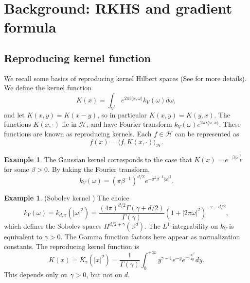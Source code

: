 \documentclass[a4paper]{article}
\theoremstyle{definition}
\newtheorem{eg}[thm]{Example}
\newcommand{\R}{\mathbb{R}}
\newcommand{\1}{\mathbbm{1}}
\begin{document}
	
	
	
	
	
	
	
	
	
	
	
	
	
	
	
	
	
	
	
	
	\section{Background: RKHS and gradient formula}
	
	
	
	\subsection{Reproducing kernel function}
	
	
	
	We recall some basics of reproducing kernel Hilbert spaces (See \cite{RuanLi} for more details). 
	We define the kernel function
	\begin{equation}
		K(x)= \int_{V^*} e^{2\pi i \langle x, \omega\rangle} k_V(\omega) d\omega,
	\end{equation}
	and let $K(x, y)= K(x-y)$, so in particular $K(x,y)=\overline{K(y,x)}$. The functions $K(x,\cdot)$ lie in $\mathcal{H}$, and have Fourier transform $k_V(\omega) e^{2\pi i \langle \omega, x\rangle}$. These functions are known as reproducing kernels. 
	Each $f\in \mathcal{H}$ can be represented as 
	\begin{equation}\label{reproducingformula}
		f(x)= \langle f, K(x,\cdot)\rangle_{\mathcal{H}}.
	\end{equation}
	
	
	\begin{eg}\label{eg:Gaussiankernel}
		The Gaussian kernel corresponds to the case that $K(x)=e^{-\beta |x|_V^2}$ for some $\beta>0$. By taking the Fourier transform,
		\[
		k_V(\omega)= (\pi \beta^{-1})^{d/2} e^{- \pi^2 
			\beta^{-1} |
			\omega|^2}.
		\]
	\end{eg}
	
	\begin{eg}\label{eg:Sobolevkernel}
		(Sobolev kernel \cite[Section 4.5]{RuanLi}) The choice
		\[
		k_V(\omega)=k_{d,\gamma}(|\omega|^2)=\frac{(4\pi)^{d/2}\Gamma(\gamma+d/2 )}{  \Gamma(\gamma) } (1+|2\pi \omega|^2)^{-\gamma-d/2},
		\]
		which defines the Sobolev spaces $H^{d/2+\gamma}(\R^d)$. The $L^1$-integrability on $k_V$ is equivalent to $\gamma>0$. The Gamma function factors here appear as normalization constants. The reproducing kernel function is
		\[
		K(x)=  K_\gamma(|x|^2)=   \frac{  1  }{\Gamma(\gamma)} \int_0^{+\infty} y^{\gamma-1} e^{-y} e^{- \frac{ |x|^2}{4y} }dy .
		\]
		This depends only on $\gamma>0$, but not on $d$.
	\end{eg}
	
\end{document}
